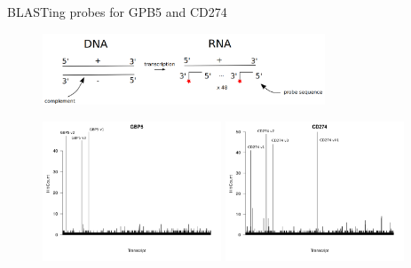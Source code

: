 \documentclass[aspectratio=1610]{beamer}					%
\begin{document}
\begin{frame}{BLASTing probes for GPB5 and CD274}
\begin{figure}
   \includegraphics[width=0.75\textwidth]{Probe-Design.png}
\end{figure}
\begin{figure}
   \includegraphics[width=0.475\textwidth]{GBP5_Hits.png}
   \hfill
   \includegraphics[width=0.475\textwidth]{CD274_Hits.png}
\end{figure}
\end{frame}
\end{document}
